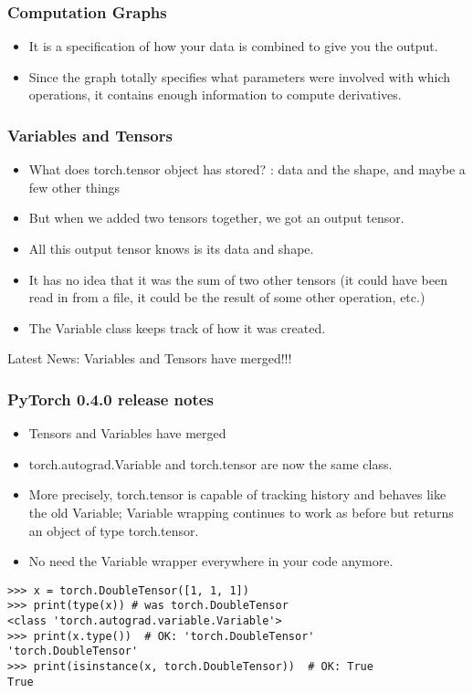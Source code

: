 \begin{frame}[fragile]
\frametitle{Computation Graphs}

\begin{itemize}
\item It is a specification of how your data is combined to give you the output. 
\item Since the graph totally specifies what parameters were involved with which operations, it contains enough information to compute derivatives.
\end{itemize}
\end{frame} 

 
\begin{frame}[fragile]
\frametitle{Variables and Tensors}
\begin{itemize}
\item What does torch.tensor object has stored? : data and the shape, and maybe a few other things
\item But when we added two tensors together, we got an output tensor. 
\item All this output tensor knows is its data and shape. 
\item It has no idea that it was the sum of two other tensors (it could have been read in from a file, it could be the result of some other operation, etc.)
\item The Variable class keeps track of how it was created. 
\end{itemize}
Latest News: Variables and Tensors have merged!!!
\end{frame} 
 
 
\begin{frame}[fragile]
\frametitle{PyTorch 0.4.0 release notes}
\begin{itemize}
\item Tensors and Variables have merged
\item torch.autograd.Variable and torch.tensor are now the same class. 
\item More precisely, torch.tensor is capable of tracking history and behaves like the old Variable; Variable wrapping continues to work as before but returns an object of type torch.tensor. \item No need the Variable wrapper everywhere in your code anymore.
\end{itemize}
 \begin{lstlisting}
>>> x = torch.DoubleTensor([1, 1, 1])
>>> print(type(x)) # was torch.DoubleTensor
<class 'torch.autograd.variable.Variable'>
>>> print(x.type())  # OK: 'torch.DoubleTensor'
'torch.DoubleTensor'
>>> print(isinstance(x, torch.DoubleTensor))  # OK: True
True
\end{lstlisting}
\end{frame} 
 
